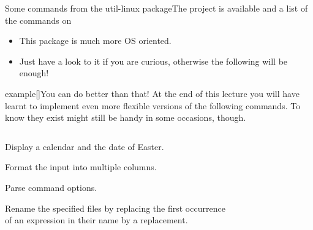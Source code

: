 \begin{frame}{Some commands from the util-linux package}{The project is available  and a list of the commands on }
    \vspace{-1mm}
    \begin{itemize}
        \item This package is much more OS oriented.
        \item Just have a look to it if you are curious, otherwise the following will be enough!
    \end{itemize}
    \vspace{-1mm}
    \begin{varblock}{example}[\textwidth]{You can do better than that!}
        At the end of this lecture you will have learnt to implement even more flexible versions of the following commands.
        To know they exist might still be handy in some occasions, though.
    \end{varblock}
    \vspace{-5mm}
    \begin{columns}
        \begin{column}{\dimexpr\paperwidth-10mm}
            \small
            \begin{description}
                \setlength{\itemsep}{1mm}
                \item[\PB{\texttt{cal}}]
                    Display a calendar and the date of Easter.
                \item[\PB{\texttt{column}}]
                    Format the input into multiple columns.
                \item[\PB{\texttt{getopt}}]
                    Parse command options.
                \item[\PB{\texttt{rename}}]
                    Rename the specified files by replacing the first occurrence\\ of an expression in their name by a replacement.
            \end{description}
        \end{column}
    \end{columns}
    \PrepareURLsymbol[PB]
\end{frame}
